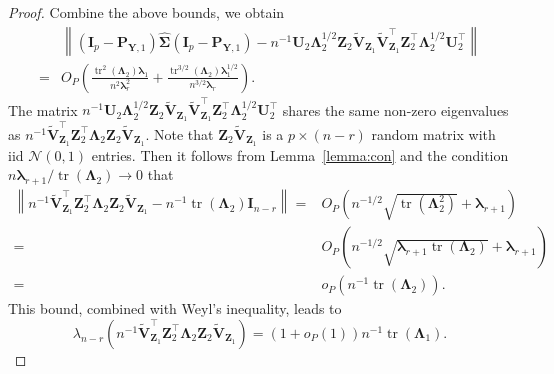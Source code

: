 \documentclass[10pt]{book}
\theoremstyle{definition}
\DeclareMathOperator{\mytr}{tr}
\newcommand{\bZ}{\mathbf{Z}}
\newcommand{\bP}{\mathbf{P}}
\newcommand{\bY}{\mathbf{Y}}
\newcommand{\bI}{\mathbf{I}}
\newcommand{\bU}{\mathbf{U}}
\newcommand{\bV}{\mathbf{V}}
\newcommand{\bfsym}[1]{\ensuremath{\boldsymbol{#1}}}
\def\blambda {\bfsym {\lambda}}
\def\bLambda {\bfsym {\Lambda}}
\def\bSigma {\bfsym {\Sigma}}
\begin{document}
\begin{proof}
    Combine the above bounds, we obtain
    \begin{equation}\label{haoqilai1}
        \begin{split}
             &\left\|(\bI_p -\bP_{\bY,1})\hat{\bSigma}(\bI_p -\bP_{\bY,1})
             -
         n^{-1}\bU_2 \bLambda_2^{1/2} \bZ_2 \tilde{\bV}_{\bZ_1}\tilde{\bV}_{\bZ_1}^\top  \bZ_2^\top \bLambda_2^{1/2} \bU_2^\top
             \right\|
             \\
             =&
             O_P\left(
                    \frac{\mytr^2(\bLambda_2)\blambda_1}{n^2 \blambda_r^2}
                 +
                 \frac{\mytr^{3/2}(\bLambda_2)\blambda_1^{1/2}}{n^{3/2}\blambda_r}
                \right).
        \end{split}
    \end{equation}
    The matrix $n^{-1}\bU_2 \bLambda_2^{1/2} \bZ_2 \tilde{\bV}_{\bZ_1}\tilde{\bV}_{\bZ_1}^\top  \bZ_2^\top \bLambda_2^{1/2} \bU_2^\top$ shares the same non-zero eigenvalues as $n^{-1} \tilde{\bV}_{\bZ_1}^\top\bZ_2^\top\bLambda_2 \bZ_2 \tilde{\bV}_{\bZ_1}$.
    Note that $\bZ_{2}\tilde{\bV}_{\bZ_1}$ is a $p\times (n-r)$ random matrix with iid $\mathcal{N}(0,1)$ entries.
    Then it follows from Lemma~\ref{lemma:con} and the condition $n\blambda_{r+1}/\mytr(\bLambda_2)\to 0$ that
    \begin{equation}\label{choc8}
        \begin{split}
        \left\|
        n^{-1} \tilde{\bV}_{\bZ_1}^\top\bZ_2^\top\bLambda_2 \bZ_2 \tilde{\bV}_{\bZ_1}-n^{-1}\mytr(\bLambda_2)\bI_{n-r}
        \right\|
        =&O_P\left(n^{-1/2}\sqrt{\mytr(\bLambda_2^2)}+\blambda_{r+1}\right)
        \\
        = &
        O_P\left(n^{-1/2}\sqrt{\blambda_{r+1}\mytr(\bLambda_2)}+\blambda_{r+1}\right)
        \\
        =& o_P\left(n^{-1}\mytr(\bLambda_2)\right).
        \end{split}
    \end{equation}
    This bound, combined with Weyl's inequality, leads to
    \begin{equation}\label{haoqilai2}
        \lambda_{n-r}\left(
            n^{-1} \tilde{\bV}_{\bZ_1}^\top\bZ_2^\top\bLambda_2 \bZ_2 \tilde{\bV}_{\bZ_1}   
        \right)
        =(1+o_P(1))n^{-1}\mytr(\bLambda_1).
    \end{equation}

\end{proof}
\end{document}

